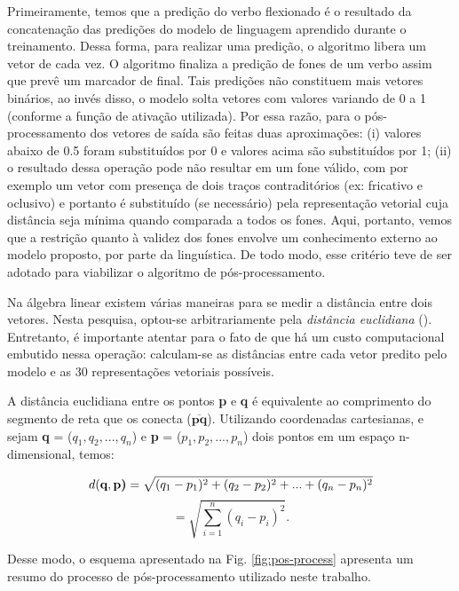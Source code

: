 Primeiramente, temos que a predição do verbo flexionado é o resultado da concatenação das predições do modelo de linguagem aprendido durante o treinamento. Dessa forma, para realizar uma predição, o algoritmo libera um vetor de cada vez. O algoritmo finaliza a predição de fones de um verbo assim que prevê um marcador de final. Tais predições não constituem mais vetores binários, ao invés disso, o modelo solta vetores com valores variando de 0 a 1 (conforme a função de ativação utilizada). Por essa razão, para o pós-processamento dos vetores de saída são feitas duas aproximações: (i) valores abaixo de 0.5 foram substituídos por 0 e valores acima são substituídos por 1; (ii) o resultado dessa operação pode não resultar em um fone válido, com por exemplo um vetor com presença de dois traços contraditórios (ex: fricativo e oclusivo) e portanto é substituído (se necessário) pela representação vetorial cuja distância seja mínima quando comparada a todos os fones. Aqui, portanto, vemos que a restrição quanto à validez dos fones envolve um conhecimento externo ao modelo proposto, por parte da linguística. De todo modo, esse critério teve de ser adotado para viabilizar o algoritmo de pós-processamento. 

Na álgebra linear existem várias maneiras para se medir a distância entre dois vetores. Nesta pesquisa, optou-se arbitrariamente pela \textit{distância euclidiana} (\cite{boulos2009geometria}). Entretanto, é importante atentar para o fato de que há um custo computacional embutido nessa operação: calculam-se as distâncias entre cada vetor predito pelo modelo e as 30 representações vetoriais possíveis. 

A distância euclidiana entre os pontos \textbf{p} e \textbf{q} é equivalente ao comprimento do segmento de reta que os conecta (${\displaystyle {\overline {\mathbf {p} \mathbf {q} }}}$). Utilizando coordenadas cartesianas, e sejam \textbf{q} = ($q_1, q_2, ..., q_n$) e \textbf{p} = ($p_1, p_2, ..., p_n$) dois pontos em um espaço n-dimensional, temos:

\begin{equation}
    d(\textbf{q}, \textbf{p)} = \sqrt{(q_1 - p_1)^2 + (q_2 - p_2)^2 + ... + (q_n - p_n)^2}\notag
\end{equation}
\begin{equation}
    = \sqrt{\sum_{i=1}^n (q_i-p_i)^2}.    
\end{equation}

Desse modo, o esquema apresentado na Fig. \ref{fig:pos-process} apresenta um resumo do processo de pós-processamento utilizado neste trabalho.


 





